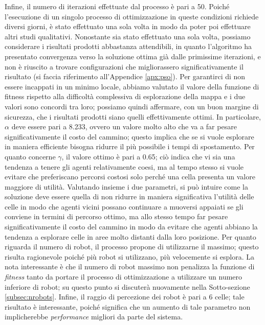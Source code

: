 Infine, il numero di iterazioni effettuate dal processo è pari a 50.
Poiché l'esecuzione di un singolo processo di ottimizzazione in queste condizioni richiede diversi giorni, è stato effettuato una sola volta in modo da poter poi effettuare altri studi qualitativi. 
Nonostante sia stato effettuato una sola volta, possiamo considerare i risultati prodotti abbastanza attendibili, in quanto l'algoritmo ha presentato convergenza verso la soluzione ottima già dalle primissime iterazioni, e non è riuscito a trovare configurazioni che migliorassero significativamente il risultato (si faccia riferimento all'Appendice \ref{apx:pso}).
Per garantirci di non essere incappati in un minimo locale, abbiamo valutato il valore della funzione di fitness rispetto alla difficoltà complessiva di esplorazione della mappa e i due valori sono concordi tra loro; possiamo quindi affermare, con un buon margine di sicurezza, che i risultati prodotti siano quelli effettivamente ottimi.
In particolare, $\alpha$ deve essere pari a 8.233, ovvero un valore molto alto che va a far pesare significativamente il costo del cammino; questo implica che se si vuole esplorare in maniera efficiente bisogna ridurre il più possibile i tempi di spostamento.
Per quanto concerne $\gamma$, il valore ottimo è pari a 0.65; ciò indica che vi sia una tendenza a tenere gli agenti relativamente coesi, ma al tempo stesso si vuole evitare che preferiscano percorsi costosi solo perché una cella presenta un valore maggiore di utilità.
Valutando insieme i due parametri, si può intuire come la soluzione deve essere quella di non ridurre in maniera significativa l'utilità delle celle in modo che agenti vicini possano continuare a muoversi appaiati se gli conviene in termini di percorso ottimo, ma allo stesso tempo far pesare significativamente il costo del cammino in modo da evitare che agenti abbiano la tendenza a esplorare celle in aree molto distanti dalla loro posizione.
Per quanto riguarda il numero di robot, il processo propone di utilizzarne il massimo; questo risulta ragionevole poiché più robot si utilizzano, più velocemente si esplora. La nota interessante è che il numero di robot massimo non penalizza la funzione di \textit{fitness} tanto da portare il processo di ottimizzazione a utilizzare un numero inferiore di robot; su questo punto si discuterà nuovamente nella Sotto-sezione \ref{subsec:nrobots}.
Infine, il raggio di percezione dei robot è pari a 6 celle; tale risultato è interessante, poiché significa che un aumento di tale parametro non implicherebbe \textit{performance} migliori da parte del sistema.